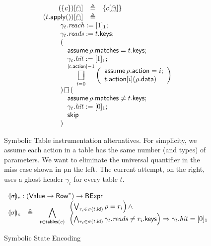 \documentclass{article}
\newcommand{\Value}{\mathsf{Value}}
\newcommand{\BExpr}{\mathsf{BExpr}}
\newcommand{\Row}{\mathsf{Row}}
\newcommand{\matches}{\mathsf{matches}}
\newcommand{\action}{\mathsf{action}}
\newcommand{\keys}{\mathsf{keys}}
\newcommand{\data}{\mathsf{data}}
\newcommand{\id}{\mathsf{id}}
\newcommand{\reach}{\mathit{\mathit{reach}}}
\newcommand{\hit}{\mathit{hit}}
\newcommand{\reads}{\mathit{reads}}
\newcommand{\assume}{\mathop{\mathsf{assume}}}
\newcommand{\apply}{\mathsf{apply}}
\newcommand{\choiceop}{\rotatebox[origin=c]{90}{$\sqsubset\!\!\!\sqsupset$}}
\newcommand{\choice}{\mathbin{\choiceop}}
\DeclareMathOperator*{\bigchoice}{\scalerel*{\choiceop}{\sum}}
\newcommand{\SKIP}{\mathsf{skip}}
\newcommand{\state}[1]{\llparenthesis#1\rrparenthesis}
\newcommand{\ginstr}{[\mathghost]}
\newcommand{\tables}{\mathop{\mathsf{tables}}}
\begin{document}
\begin{figure}[htp]
\begin{minipage}[t]{0.45\textwidth}
\[\begin{array}{r >{\triangleq}cl}
  (\{c\})\ginstr && \{c\ginstr\}\\
  (t.\apply())\ginstr &&\\
  \multicolumn{3}{l}{
    \qquad
    \begin{array}[t]{l} \displaystyle
    \gamma_t.\reach := [1]_1; \\
    \gamma_t.\reads := t.\keys; \\
    (\\
    \quad \assume \rho.\matches = t.\keys; \\
    \quad \gamma_t.\hit := [1]_1; \\
    \quad \displaystyle \bigchoice_{i=0}^{|t.\action| -1}
    \left(\begin{array}{l}
    \assume \rho.\action = i;\\
    t.\action[i](\rho.\data)
    \end{array}\right)\\
    ) \choice ( \\
    \quad \assume \rho.\matches \neq t.\keys; \\
    \quad \gamma_t.\hit := [0]_1;\\
    \quad \SKIP \\
    )
  \end{array}}
  \end{array}
  \]
  \end{minipage}
  \caption{Symbolic Table instrumentation alternatives. For simplicity, we
    assume each action in a table has the same number (and types) of parameters.
    We want to eliminate the universal quantifier in the miss case shown in
    pn the left. The current attempt, on the right, uses a ghost header
    $\gamma_t$ for every table $t$. }
  \label{fig:table-instrument}
\end{figure}

\begin{figure}[htp]
  \[\begin{array}{r cl}
  \multicolumn{3}{l}{\state\sigma_c : (\Value \to \Row^*) \to \BExpr} \\
  \state\sigma_c &\triangleq
  & \displaystyle\bigwedge_{ t \in \tables(c) }
  \begin{array}{l}
  \left(\bigvee_{r_i \in \sigma(t.\id)}
  \rho = r_i\right) \wedge \\
  \left(\bigwedge_{r_i \in \sigma(t.\id)}
  \gamma_t.\mathit{reads} \neq r_i.\keys\right)
  \Rightarrow \gamma_t.\mathit{hit} = [0]_1
  \end{array}
  \end{array}
  \]
  \caption{Symbolic State Encoding}
  \label{fig:table-instrument}
\end{figure}
\end{document}
